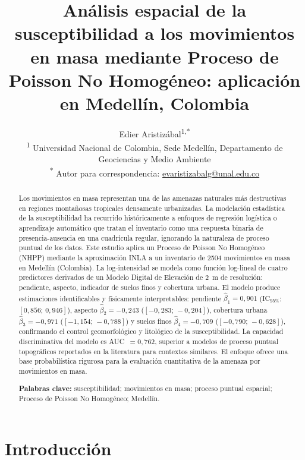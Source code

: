\documentclass[12pt, a4paper]{article}
\title{Análisis espacial de la susceptibilidad a los movimientos en masa mediante Proceso de Poisson No Homogéneo: aplicación en Medellín, Colombia}
\author{
  Edier Aristizábal\textsuperscript{1,*}\\[6pt]
  \small\textsuperscript{1} Universidad Nacional de Colombia, Sede Medellín,
  Departamento de Geociencias y Medio Ambiente\\
  \small\textsuperscript{*} Autor para correspondencia:
  \href{mailto:evaristizabalg@unal.edu.co}{evaristizabalg@unal.edu.co}
}
\begin{document}
\maketitle

\begin{abstract}
Los movimientos en masa representan una de las amenazas naturales más destructivas
en regiones montañosas tropicales densamente urbanizadas. La modelación estadística
de la susceptibilidad ha recurrido históricamente a enfoques de regresión logística
o aprendizaje automático que tratan el inventario como una respuesta binaria de
presencia-ausencia en una cuadrícula regular, ignorando la naturaleza de proceso
puntual de los datos. Este estudio aplica un Proceso de Poisson No Homogéneo (NHPP)
mediante la aproximación INLA a un inventario de \num{2504} movimientos en masa en
Medellín (Colombia). La log-intensidad se modela como función log-lineal
de cuatro predictores derivados de un Modelo Digital de Elevación de \SI{2}{m} de
resolución: pendiente, aspecto, indicador de suelos finos y cobertura urbana.
El modelo produce estimaciones identificables y físicamente interpretables:
pendiente $\hat{\beta}_1 = 0{,}901$ ($\text{IC}_{95\%}$: $[0{,}856;\,0{,}946]$),
aspecto $\hat{\beta}_2 = -0{,}243$ ($[-0{,}283;\,-0{,}204]$),
cobertura urbana $\hat{\beta}_3 = -0{,}971$ ($[-1{,}154;\,-0{,}788]$) y
suelos finos $\hat{\beta}_4 = -0{,}709$ ($[-0{,}790;\,-0{,}628]$),
confirmando el control geomorfológico y litológico de la susceptibilidad.
La capacidad discriminativa del modelo es AUC~$= 0{,}762$, superior a
modelos de proceso puntual topográficos reportados en la literatura para contextos
similares. El enfoque ofrece una base probabilística rigurosa para la evaluación cuantitativa de la amenaza por movimientos en masa.

\smallskip
\noindent\textbf{Palabras clave:} susceptibilidad; movimientos en masa; proceso
puntual espacial; Proceso de Poisson No Homogéneo; Medellín.
\end{abstract}

\section{Introducción}
\label{sec:intro}
\end{document}
